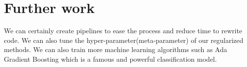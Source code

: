 \documentclass[11pt]{article}
\begin{document}
\section{Further work}
We can certainly create pipelines to ease the process and reduce time to rewrite code. We can also tune the hyper-parameter(meta-parameter) of our regularized methods. We can also train more machine learning algorithms such as Ada Gradient Boosting which is a famous and powerful classification model.






\end{document}

